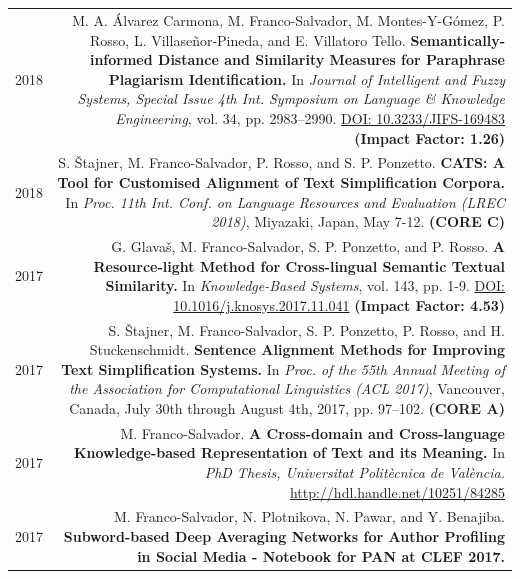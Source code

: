 \documentclass[10pt]{article}
\begin{document}
\section*{}
\begin{tabular}{L!{\VRule}R}	
	2018&M. A. {\'A}lvarez Carmona,  M. Franco-Salvador, M. Montes-Y-G{\'o}mez, P. Rosso, L. Villase{\~n}or-Pineda, and E. Villatoro Tello. \textbf{Semantically-informed Distance and Similarity Measures for Paraphrase Plagiarism Identification.}
	In \emph{Journal of Intelligent and Fuzzy Systems, Special Issue 4th Int. Symposium on Language \& Knowledge Engineering}, vol. 34, pp. 2983--2990. \href{https://doi.org/10.3233/JIFS-169483}{DOI: 10.3233/JIFS-169483} \textbf{(Impact Factor: 1.26)} \vspace{5pt}\\	
    2018 & S. \v{S}tajner, M. Franco-Salvador, P. Rosso, and S. P. Ponzetto. \textbf{CATS: A Tool for Customised Alignment of Text Simplification Corpora.} In \emph{Proc. 11th Int. Conf. on Language Resources and Evaluation (LREC 2018)}, Miyazaki, Japan, May 7-12. \textbf{(CORE C)} \vspace{5pt}\\
    2017 & G. Glava{\v s}, M. Franco-Salvador, S. P. Ponzetto, and P. Rosso. \textbf{A Resource-light Method for Cross-lingual Semantic Textual Similarity.}
	In \emph{Knowledge-Based Systems}, vol. 143, pp. 1-9. \href{https://doi.org/10.1016/j.knosys.2017.11.041}{DOI: 10.1016/j.knosys.2017.11.041} \textbf{(Impact Factor: 4.53)} \vspace{5pt}\\	
	2017& S. \v{S}tajner, M. Franco-Salvador, S. P. Ponzetto, P. Rosso, and H. Stuckenschmidt. \textbf{Sentence Alignment Methods for Improving Text Simplification Systems.}
	In \emph{Proc. of the 55th Annual Meeting of the Association for Computational Linguistics (ACL 2017)},  Vancouver, Canada, July 30th through August 4th, 2017, pp. 97--102. \textbf{(CORE A)}\vspace{5pt}\\
	2017& M. Franco-Salvador. \textbf{A Cross-domain and Cross-language Knowledge-based Representation of Text and its Meaning.}
	In \emph{PhD Thesis, Universitat Polit{\`e}cnica de Val{\`e}ncia.} \href{http://hdl.handle.net/10251/84285}{http://hdl.handle.net/10251/84285}\vspace{5pt}\\
	2017& M. Franco-Salvador, N. Plotnikova, N. Pawar, and Y. Benajiba. \textbf{Subword-based Deep Averaging Networks for Author Profiling in Social Media - Notebook for PAN at CLEF 2017.}

\end{tabular}
\end{document}
